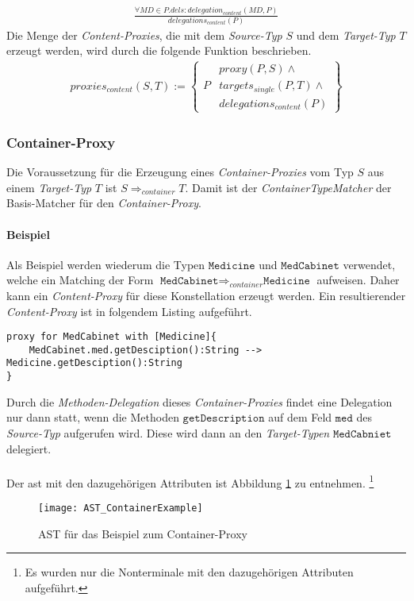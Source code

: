 \begin{gather*}
\frac{\mathit{\forall \mathit{MD} \in P.dels: \mathit{delegation_{content}(MD,P)}}}
{\mathit{delegations_{content}(P)}}
\end{gather*}
\noindent
Die Menge der \emph{Content-Proxies}, die mit dem \emph{Source-Typ} $S$ und dem \emph{Target-Typ} $T$ erzeugt werden, wird durch die folgende Funktion beschrieben.
\begin{gather*}
\mathit{proxies_{content}(S,T)} := 
\left\{\begin{array}{l|l}
		& \mathit{proxy(P,S)} \wedge \mathit{ } \\
	P	& \mathit{targets_{single}(P,T)} \wedge \mathit{ }\\
		& \mathit{delegations_{content}(P)} 
		 \end{array}
\right\}
\end{gather*}
\subsubsection{Container-Proxy}
Die Voraussetzung für die Erzeugung eines \emph{Container-Proxies} vom Typ $S$ aus einem \emph{Target-Typ} $T$ ist $S \Rightarrow_{container} T$. Damit ist der \emph{ContainerTypeMatcher} der Basis-Matcher für den \emph{Container-Proxy}.
\paragraph{Beispiel}
Als Beispiel werden wiederum die Typen $\texttt{Medicine}$ und $\texttt{MedCabinet}$ verwendet, welche ein Matching der Form $\texttt{MedCabinet} \Rightarrow_{container} \texttt{Medicine}$ aufweisen. Daher kann ein \emph{Content-Proxy} für diese Konstellation erzeugt werden. Ein resultierender \emph{Content-Proxy} ist in folgendem Listing aufgeführt.
\begin{lstlisting}[style = dsl, caption = Container-Proxy für MedCabniet, captionpos = b ]
proxy for MedCabinet with [Medicine]{
	MedCabinet.med.getDesciption():String --> Medicine.getDesciption():String
}
\end{lstlisting}
Durch die \emph{Methoden-Delegation} dieses \emph{Container-Proxies} findet eine Delegation nur dann statt, wenn die Methoden $\texttt{getDescription}$ auf dem Feld $\texttt{med}$ des \emph{Source-Typ} aufgerufen wird. Diese wird dann an den \emph{Target-Typen} $\texttt{MedCabniet}$ delegiert.
\\\\
Der \acrshort{ast} mit den dazugehörigen Attributen ist Abbildung \ref{fig:ASTCONTAINER} zu entnehmen. \footnote{Es wurden nur die Nonterminale mit den dazugehörigen Attributen aufgeführt.}
\begin{figure}[h!]
\centering
\texttt{[image: AST\_ContainerExample]}
\caption{AST für das Beispiel zum Container-Proxy}
\label{fig:ASTCONTAINER}
\end{figure}
\noindent
